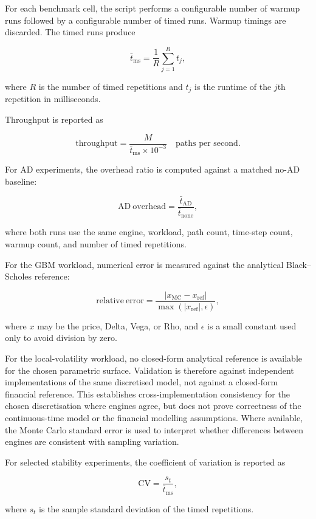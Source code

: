 For each benchmark cell, the script performs a configurable number of warmup
runs followed by a configurable number of timed runs.  Warmup timings are
discarded.  The timed runs produce

\[
    \bar{t}_{\mathrm{ms}}
    =
    \frac{1}{R}
    \sum_{j=1}^{R} t_j,
\]

where \(R\) is the number of timed repetitions and \(t_j\) is the runtime of
the \(j\)th repetition in milliseconds.

Throughput is reported as

\[
    \mathrm{throughput}
    =
    \frac{M}{\bar{t}_{\mathrm{ms}} \times 10^{-3}}
    \quad
    \text{paths per second}.
\]

For AD experiments, the overhead ratio is computed against a matched no-AD
baseline:

\[
    \mathrm{AD\ overhead}
    =
    \frac{\bar{t}_{\mathrm{AD}}}
         {\bar{t}_{\mathrm{none}}},
\]

where both runs use the same engine, workload, path count, time-step count,
warmup count, and number of timed repetitions.

For the GBM workload, numerical error is measured against the analytical
Black--Scholes reference:

\[
    \mathrm{relative\ error}
    =
    \frac{|x_{\mathrm{MC}} - x_{\mathrm{ref}}|}
         {\max(|x_{\mathrm{ref}}|,\epsilon)},
\]

where \(x\) may be the price, Delta, Vega, or Rho, and \(\epsilon\) is a
small constant used only to avoid division by zero.

For the local-volatility workload, no closed-form analytical reference is
available for the chosen parametric surface. Validation is therefore against
independent implementations of the same discretised model, not against a
closed-form financial reference. This establishes cross-implementation
consistency for the chosen discretisation where engines agree, but does not
prove correctness of the continuous-time model or the financial modelling
assumptions. Where available, the Monte Carlo standard error is used to
interpret whether differences between engines are consistent with sampling
variation.

For selected stability experiments, the coefficient of variation is reported
as

\[
    \mathrm{CV}
    =
    \frac{s_t}{\bar{t}_{\mathrm{ms}}},
\]

where \(s_t\) is the sample standard deviation of the timed repetitions.

